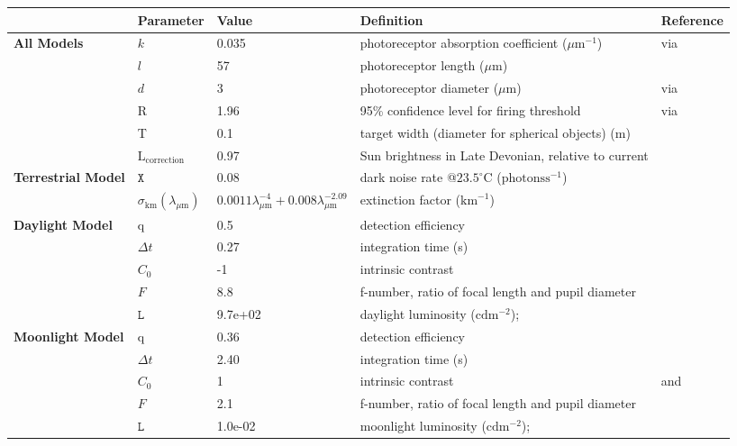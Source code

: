 \begin{tabular}{|L{3.5cm}|L{2cm}|L{2cm}|L{4.5cm}|L{4.5cm}|}
\hline
\textbf{ }&\textbf{Parameter}&\textbf{Value}&\textbf{Definition}&\textbf{Reference}\\\hline
\textbf{All Models}&$k$&0.035&photoreceptor absorption coefficient ($\mu \text{m}^{-1}$)&\cite{Part90a} via \cite{Warr98a}\\\hline
 &$l$&57&photoreceptor length ($\mu \text{m}$)&\cite{Nils14a}\\\hline
 &$d$&3&photoreceptor diameter ($\mu \text{m}$)&\cite{Land12a} via \cite{Nils14a}\\\hline
 &R&1.96&95\% confidence level for firing threshold&\cite{Land81a} via \cite{Nils14a}\\\hline
 &T&0.1&target width (diameter for spherical objects) (m)& \\\hline
 &$\text{L}_{\text{correction}}$&0.97&Sun brightness in Late Devonian, relative to current&\cite{Bahc01a}\\\hline
\textbf{Terrestrial Model}&$\mathtt{X}$&0.08&dark noise rate @$23.5^{\circ} \text{C}$ ($\text{photons} \text{s}^{-1}$)&\cite{Aho93a}\\\hline
 &$\sigma_{\text{km}} (\lambda_{\mu \text{m}})$&$0.0011 \lambda_{\mu \text{m}}^{-4} + 0.008 \lambda_{\mu \text{m}}^{-2.09}$&extinction factor ($\text{km}^{-1}$)&\cite{Midd52a}\\\hline
\textbf{Daylight Model}&q&0.5&detection efficiency&\cite{Pirh07a}\\\hline
 &$\Delta t$&0.27&integration time (s)&\cite{Donn95a}\\\hline
 &$C_{0}$&-1&intrinsic contrast&\cite{Blac46a}\\\hline
 &$F$&8.8&f-number, ratio of focal length and pupil diameter&\cite{Mill79a}\\\hline
 &$\mathtt{L}$&9.7e+02&daylight luminosity ($\text{cd} \text{m}^{-2}$);&\cite{Midd52a}\\\hline
\textbf{Moonlight Model}&q&0.36&detection efficiency&\cite{Nils14a}\\\hline
 &$\Delta t$&2.40&integration time (s)&\cite{Donn95a}\\\hline
 &$C_{0}$&1&intrinsic contrast&\cite{Hest68a} and \cite{Blac46a}\\\hline
 &$F$&2.1&f-number, ratio of focal length and pupil diameter&\cite{Mill79a}\\\hline
 &$\mathtt{L}$&1.0e-02&moonlight luminosity ($\text{cd} \text{m}^{-2}$);&\cite{Midd52a}\\\hline

\end{tabular}
